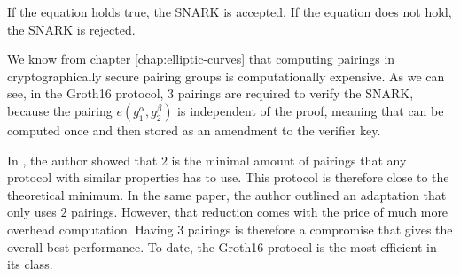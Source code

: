 If the equation holds true, the SNARK is accepted. If the equation does not hold, the SNARK is rejected.

\begin{remark}
We know from chapter \ref{chap:elliptic-curves} that computing pairings in cryptographically secure pairing groups is computationally expensive. As we can see, in the Groth16 protocol, $3$ pairings are required to verify the SNARK, because the pairing $e(g_1^\alpha,g_2^\beta)$ is independent of the proof, meaning that can be computed once and then stored as an amendment to the verifier key. 

In \cite{Groth16}, the author showed that $2$ is the minimal amount of pairings that any protocol with similar properties has to use. This protocol is therefore close to the theoretical minimum. In the same paper, the author outlined an adaptation that only uses $2$ pairings. However, that reduction comes with the price of much more overhead computation. Having $3$ pairings is therefore a compromise that gives the overall best performance. To date, the Groth16 protocol is the most efficient in its class. 
\end{remark}

